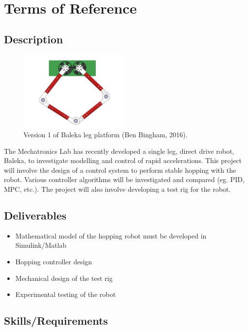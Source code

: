\chapter{Terms of Reference}

\section*{Description}

\begin{figure}[H]
\centering
\includegraphics[width=0.5\textwidth,trim={0cm 0cm 0cm 0cm},clip]{images/mechanical/legsV1.pdf}
\caption{Version 1 of Baleka leg platform (Ben Bingham, 2016).}
\label{fig:legV1}
\end{figure}

The Mechatronics Lab has recently developed a single leg, direct drive robot,
Baleka, to investigate modelling and control of rapid accelerations.
This project will involve the design of a control system to perform stable
hopping with the robot. Various controller algorithms will be investigated and
compared (eg. PID, MPC, etc.). The project will also involve developing a test
rig for the robot.

\section*{Deliverables}

\begin{itemize}
\item Mathematical model of the hopping robot must be developed in
Simulink/Matlab
\item Hopping controller design
\item Mechanical design of the test rig
\item Experimental testing of the robot
\end{itemize}

\section*{Skills/Requirements}

